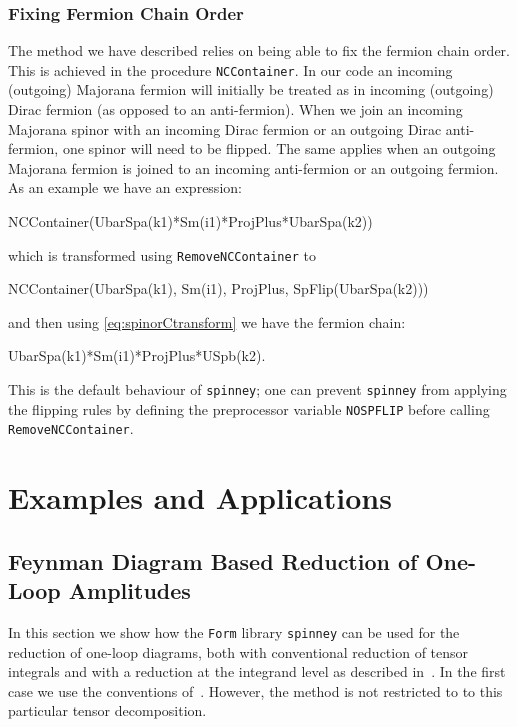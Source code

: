 \documentclass[preprint,number,12pt,sort&compress]{elsarticle}
\newcommand{\FORM}{{\texttt{Form}}}
\newcommand{\spinney}{{\texttt{spinney}}}
\begin{document}
\subsubsection{Fixing Fermion Chain Order}

The method we have described relies on being able
to fix the fermion chain order.
This is achieved in the procedure \texttt{NCContainer}.
In our code an incoming (outgoing) Majorana fermion 
will initially be treated as in incoming (outgoing) Dirac fermion (as opposed to an anti-fermion).
When we join an incoming Majorana spinor with an incoming Dirac fermion or an outgoing Dirac anti-fermion,
one spinor will need to be flipped.
The same applies when an outgoing Majorana fermion is joined to an incoming anti-fermion or an outgoing fermion.
As an example we have an expression:
\begin{form}
NCContainer(UbarSpa(k1)*Sm(i1)*ProjPlus*UbarSpa(k2))
\end{form}
which is transformed using \verb|RemoveNCContainer| to
\begin{form}
NCContainer(UbarSpa(k1), Sm(i1), ProjPlus,
				SpFlip(UbarSpa(k2)))
\end{form} and then
using \eqref{eq:spinorCtransform} we have the fermion chain:
\begin{form}
UbarSpa(k1)*Sm(i1)*ProjPlus*USpb(k2).
\end{form}

This is the default behaviour of \spinney{}; one can prevent \spinney{}
from applying the flipping rules by defining the preprocessor
variable \texttt{NOSPFLIP} before calling \texttt{RemoveNCContainer}.

\section{Examples and Applications}\label{sec:examples}
\subsection{Feynman Diagram Based Reduction of One-Loop Amplitudes}
In this section we show how the \FORM{} library \spinney{} can be used
for the reduction of one-loop diagrams, both with conventional reduction of
tensor integrals and with a reduction at the integrand level as described
in~\cite{Ossola:2006us}. In the first case we use the conventions
of~\cite{Binoth:2005ff}. However, the method is not restricted to to this
particular tensor decomposition.
\end{document}
